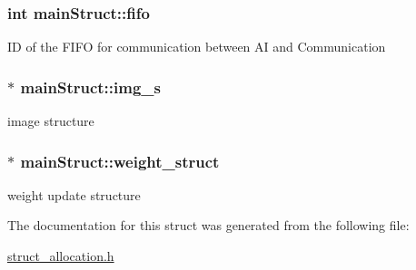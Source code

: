 \subsubsection[{\texorpdfstring{fifo}{fifo}}]{\setlength{\rightskip}{0pt plus 5cm}int main\+Struct\+::fifo}\hypertarget{structmainStruct_a70e7f60d9a8ead3e640d815b10b8ed71}{}\label{structmainStruct_a70e7f60d9a8ead3e640d815b10b8ed71}
ID of the F\+I\+FO for communication between AI and Communication 
\subsubsection[{\texorpdfstring{img\+\_\+s}{img_s}}]{$\ast$ main\+Struct\+::img\+\_\+s}\hypertarget{structmainStruct_ad2162b86abcacb3ac540e7e78642f8c3}{}\label{structmainStruct_ad2162b86abcacb3ac540e7e78642f8c3}
image structure 
\subsubsection[{\texorpdfstring{weight\+\_\+struct}{weight_struct}}]{$\ast$ main\+Struct\+::weight\+\_\+struct}\hypertarget{structmainStruct_a209255d120a094e3a908459f4abd4ab5}{}\label{structmainStruct_a209255d120a094e3a908459f4abd4ab5}
weight update structure 

The documentation for this struct was generated from the following file\+:\begin{DoxyCompactItemize}
\item 
\hyperlink{struct__allocation_8h}{struct\+\_\+allocation.\+h}\end{DoxyCompactItemize}
